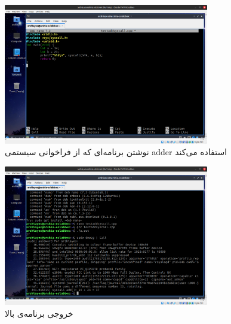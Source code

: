 \documentclass[12pt]{article}
\begin{document}
\begin{itemize}
        \begin{figure}[H]
		\centering
		\includegraphics[width=0.8\textwidth]{report2-resources/43.png}
		\caption{نوشتن برنامه‌ای که از فراخوانی سیستمی \textenglish{adder} استفاده می‌کند}
	\end{figure}

        \begin{figure}[H]
		\centering
		\includegraphics[width=0.8\textwidth]{report2-resources/44.png}
		\caption{خروجی برنامه‌ی بالا}
	\end{figure}
        \end{itemize}
    
	
	\newpage
	\begin{LTR}
		\begin{english}
                \printbibliography[title={مراجع}]
            \end{english}
	\end{LTR}

	
\end{document}
